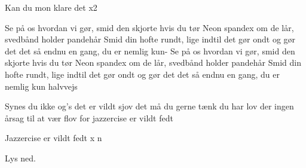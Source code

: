 \documentclass{ucph-revy}
\begin{document}
\begin{song}
Kan du mon klare det x2

Se på os hvordan vi gør, smid den skjorte hvis du tør
Neon spandex om de lår, svedbånd holder pandehår
Smid din hofte rundt, lige indtil det gør ondt
og gør det det så endnu en gang, du er nemlig kun-
Se på os hvordan vi gør, smid den skjorte hvis du tør
Neon spandex om de lår, svedbånd holder pandehår
Smid din hofte rundt, lige indtil det gør ondt
og gør det det så endnu en gang, du er nemlig kun halvvejs

Synes du ikke og’s det er vildt sjov  
det må du gerne tænk du har lov
der ingen årsag til at vær flov
for jazzercise er vildt fedt

Jazzercise er vildt fedt x n

\scene Lys ned. %

\end{song}
\end{document}
